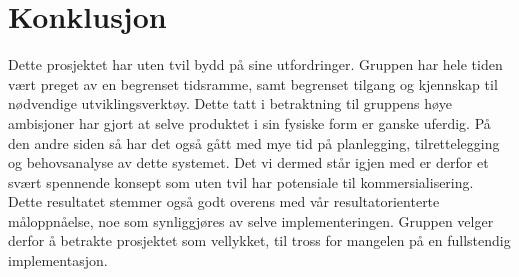 
\chapter{Konklusjon} %

\label{ch:konklusjon} %


Dette prosjektet har uten tvil bydd på sine utfordringer. Gruppen har hele tiden vært preget av en begrenset tidsramme, samt begrenset tilgang og kjennskap til nødvendige utviklingsverktøy. Dette tatt i betraktning til gruppens høye ambisjoner har gjort at selve produktet i sin fysiske form er ganske uferdig. På den andre siden så har det også gått med mye tid på planlegging, tilrettelegging og behovsanalyse av dette systemet. Det vi dermed står igjen med er derfor et svært spennende konsept som uten tvil har potensiale til kommersialisering. Dette resultatet stemmer også godt overens med vår resultatorienterte måloppnåelse, noe som synliggjøres av selve implementeringen. Gruppen velger derfor å betrakte prosjektet som vellykket, til tross for mangelen på en fullstendig implementasjon. 